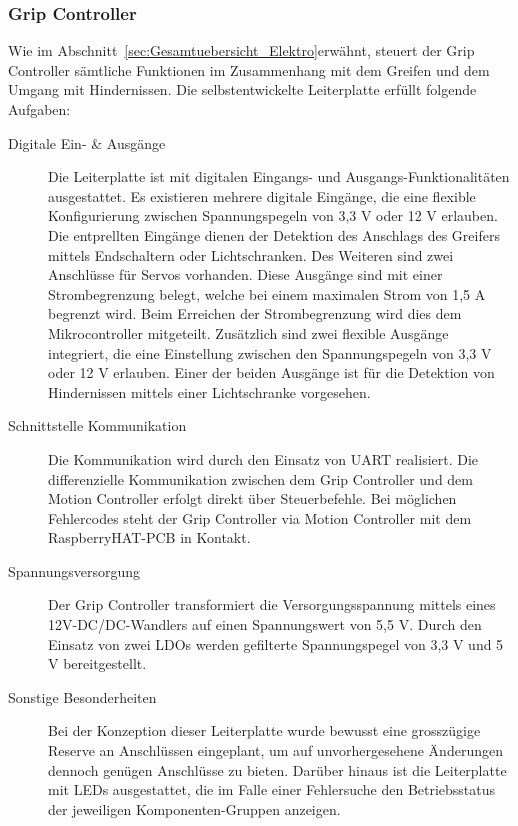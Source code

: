 \documentclass[main.tex]{subfiles} %
\begin{document}

\subsubsection{Grip Controller}
Wie im Abschnitt~\ref{sec:Gesamtuebersicht_Elektro}erwähnt, steuert der Grip
Controller sämtliche Funktionen im Zusammenhang mit dem Greifen und dem Umgang
mit Hindernissen. Die selbstentwickelte Leiterplatte erfüllt folgende Aufgaben:

\begin{description}
      \item[Digitale Ein- \& Ausgänge] Die Leiterplatte ist mit digitalen Eingangs- und
            Ausgangs-Funktionalitäten ausgestattet. Es existieren mehrere digitale
            Eingänge, die eine flexible Konfigurierung zwischen Spannungspegeln von 3,3 V
            oder 12 V erlauben. Die entprellten Eingänge dienen der Detektion des Anschlags
            des Greifers mittels Endschaltern oder Lichtschranken. Des Weiteren sind zwei
            Anschlüsse für Servos vorhanden. Diese Ausgänge sind mit einer Strombegrenzung
            belegt, welche bei einem maximalen Strom von 1,5 A begrenzt wird. Beim
            Erreichen der Strombegrenzung wird dies dem Mikrocontroller mitgeteilt.
            Zusätzlich sind zwei flexible Ausgänge integriert, die eine Einstellung
            zwischen den Spannungspegeln von 3,3 V oder 12 V erlauben. Einer der beiden
            Ausgänge ist für die Detektion von Hindernissen mittels einer Lichtschranke
            vorgesehen.

      \item[Schnittstelle Kommunikation] Die Kommunikation wird durch den Einsatz von UART
            realisiert. Die differenzielle Kommunikation zwischen dem Grip Controller und
            dem Motion Controller erfolgt direkt über Steuerbefehle. Bei möglichen
            Fehlercodes steht der Grip Controller via Motion Controller mit dem
            RaspberryHAT-PCB in Kontakt.

      \item[Spannungsversorgung] Der Grip Controller transformiert die Versorgungsspannung
            mittels eines 12V-DC/DC-Wandlers auf einen Spannungswert von 5,5 V. Durch den
            Einsatz von zwei LDOs werden gefilterte Spannungspegel von 3,3 V und 5 V
            bereitgestellt.

      \item[Sonstige Besonderheiten] Bei der Konzeption dieser Leiterplatte wurde bewusst
            eine grosszügige Reserve an Anschlüssen eingeplant, um auf unvorhergesehene
            Änderungen dennoch genügen Anschlüsse zu bieten. Darüber hinaus ist die
            Leiterplatte mit LEDs ausgestattet, die im Falle einer Fehlersuche den
            Betriebsstatus der jeweiligen Komponenten-Gruppen anzeigen.
\end{description}
\end{document}
